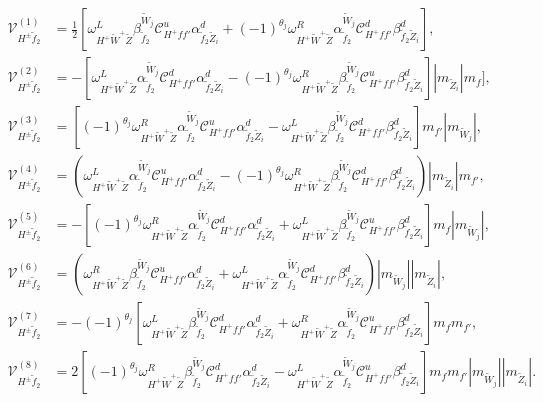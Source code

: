 \documentclass[final,3p,times,pdflatex]{elsarticle}
\begin{document}
\begin{align}
\mathcal{V}_{H^{\pm} \tilde{f}_2}^{(1)} &= \frac{1}{2}[\omega_{H^+ \tilde{W}^+ \tilde{Z}}^L \beta_{\tilde{f}_2}^{\tilde{W}_j} \mathcal{C}_{H^+ f f'}^u \alpha_{\tilde{f}_2 \tilde{Z}_i}^{d} + (-1)^{\theta_j} \omega_{H^+ \tilde{W}^+ \tilde{Z}}^R \alpha_{\tilde{f}_2}^{\tilde{W}_j} \mathcal{C}_{H^+ f f'}^d \beta_{\tilde{f}_2 \tilde{Z}_i}^{d}], \\
\mathcal{V}_{H^{\pm} \tilde{f}_2}^{(2)} &= -[\omega_{H^+ \tilde{W}^+ \tilde{Z}}^L \alpha_{\tilde{f}_2}^{\tilde{W}_j} \mathcal{C}_{H^+ f f'}^d \alpha_{\tilde{f}_2 \tilde{Z}_i}^{d} - (-1)^{\theta_j} \omega_{H^+ \tilde{W}^+ \tilde{Z}}^R \beta_{\tilde{f}_2}^{\tilde{W}_j} \mathcal{C}_{H^+ f f'}^u \beta_{\tilde{f}_2 \tilde{Z}_i}^{d}]|m_{\tilde{Z}_i}| m_{f}], \\
\mathcal{V}_{H^{\pm} \tilde{f}_2}^{(3)} &= [(-1)^{\theta_j}\omega_{H^+ \tilde{W}^+ \tilde{Z}}^R \alpha_{\tilde{f}_2}^{\tilde{W}_j} \mathcal{C}_{H^+ f f'}^u \alpha_{\tilde{f}_2 \tilde{Z}_i}^{d} -  \omega_{H^+ \tilde{W}^+ \tilde{Z}}^L \beta_{\tilde{f}_2}^{\tilde{W}_j} \mathcal{C}_{H^+ f f'}^d \beta_{\tilde{f}_2 \tilde{Z}_i}^{d}]m_{f'}|m_{\tilde{W}_j}|, \\
\mathcal{V}_{H^{\pm} \tilde{f}_2}^{(4)} &= (\omega_{H^+ \tilde{W}^+ \tilde{Z}}^L \alpha_{\tilde{f}_2}^{\tilde{W}_j} \mathcal{C}_{H^+ f f'}^u \alpha_{\tilde{f}_2 \tilde{Z}_i}^{d} - (-1)^{\theta_j} \omega_{H^+ \tilde{W}^+ \tilde{Z}}^R \beta_{\tilde{f}_2}^{\tilde{W}_j} \mathcal{C}_{H^+ f f'}^d \beta_{\tilde{f}_2 \tilde{Z}_i}^{d})|m_{\tilde{Z}_i}|m_{f'}, \\
\mathcal{V}_{H^{\pm} \tilde{f}_2}^{(5)} &= -[(-1)^{\theta_j}\omega_{H^+ \tilde{W}^+ \tilde{Z}}^R \alpha_{\tilde{f}_2}^{\tilde{W}_j} \mathcal{C}_{H^+ f f'}^d \alpha_{\tilde{f}_2 \tilde{Z}_i}^{d} + \omega_{H^+ \tilde{W}^+ \tilde{Z}}^L \beta_{\tilde{f}_2}^{\tilde{W}_j} \mathcal{C}_{H^+ f f'}^u \beta_{\tilde{f}_2 \tilde{Z}_i}^{d}]m_{f}|m_{\tilde{W}_j}|, \\
\mathcal{V}_{H^{\pm} \tilde{f}_2}^{(6)} &= (\omega_{H^+ \tilde{W}^+ \tilde{Z}}^R \beta_{\tilde{f}_2}^{\tilde{W}_j} \mathcal{C}_{H^+ f f'}^u \alpha_{\tilde{f}_2 \tilde{Z}_i}^{d} +  \omega_{H^+ \tilde{W}^+ \tilde{Z}}^L \alpha_{\tilde{f}_2}^{\tilde{W}_j} \mathcal{C}_{H^+ f f'}^d \beta_{\tilde{f}_2 \tilde{Z}_i}^{d})|m_{\tilde{W}_j}||m_{\tilde{Z}_i}|, \\
\mathcal{V}_{H^{\pm} \tilde{f}_2}^{(7)} &= -(-1)^{\theta_j}[\omega_{H^+ \tilde{W}^+ \tilde{Z}}^L \beta_{\tilde{f}_2}^{\tilde{W}_j} \mathcal{C}_{H^+ f f'}^d \alpha_{\tilde{f}_2 \tilde{Z}_i}^{d} + \omega_{H^+ \tilde{W}^+ \tilde{Z}}^R \alpha_{\tilde{f}_2}^{\tilde{W}_j} \mathcal{C}_{H^+ f f'}^u \beta_{\tilde{f}_2 \tilde{Z}_i}^{d}]m_{f}m_{f'}, \\
\mathcal{V}_{H^{\pm} \tilde{f}_2}^{(8)} &= 2[(-1)^{\theta_j}\omega_{H^+ \tilde{W}^+ \tilde{Z}}^R \beta_{\tilde{f}_2}^{\tilde{W}_j} \mathcal{C}_{H^+ f f'}^d \alpha_{\tilde{f}_2 \tilde{Z}_i}^{d} - \omega_{H^+ \tilde{W}^+ \tilde{Z}}^L \alpha_{\tilde{f}_2}^{\tilde{W}_j} \mathcal{C}_{H^+ f f'}^u \beta_{\tilde{f}_2 \tilde{Z}_i}^{d}]m_{f}m_{f'}|m_{\tilde{W}_j}||m_{\tilde{Z}_i}|.
\end{align}
\end{document}
